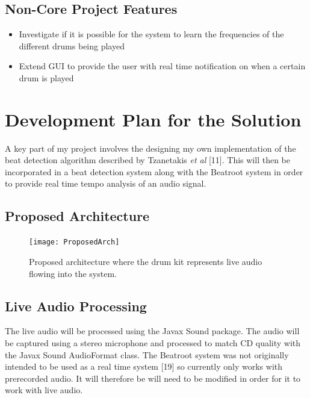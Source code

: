 \documentclass[a4paper, 11pt]{article}
\begin{document}
\subsection{Non-Core Project Features}
\begin{itemize}
\item Investigate if it is possible for the system to learn the frequencies of the different drums being played
\item Extend GUI to provide the user with real time notification on when a certain drum is played
\end{itemize}

\maketitle{} 
\section{Development Plan for the Solution}
A key part of my project involves the designing my own implementation of the beat detection algorithm described by Tzanetakis \textit{et al} [11]. This will then be incorporated in a beat detection system along with the Beatroot system in order to provide real time tempo analysis of an audio signal. 

\subsection{Proposed Architecture}

\begin{figure}[h]
	\centering
	\texttt{[image: ProposedArch]}
	\caption{Proposed architecture where the drum kit represents live audio flowing into the system.}
\end{figure}


\subsection{Live Audio Processing}
The live audio will be processed using the Javax Sound package. The audio will be captured using a stereo microphone and processed to match CD quality with the Javax Sound AudioFormat class. The Beatroot system was not originally intended to be used as a real time system [19] so currently only works with prerecorded audio. It will therefore be will need to be modified in order for it to work with live audio. 
\end{document}
